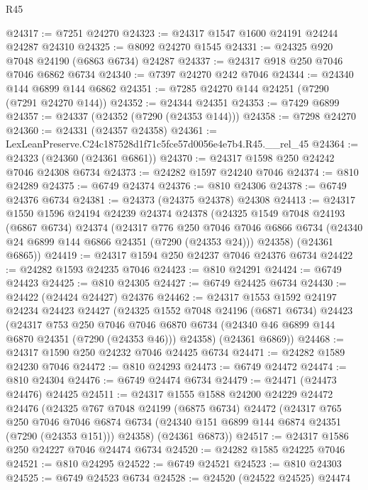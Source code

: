 \begin{lexlean}{R45}
\begin{coremodule}
{@24317 := @7251 @24270
@24323 := @24317 @1547 @1600 @24191 @24244 @24287 @24310
@24325 := @8092 @24270 @1545
@24331 := @24325 @920 @7048 @24190 (@6863 @6734) @24287
@24337 := @24317 @918 @250 @7046 @7046 @6862 @6734
@24340 := @7397 @24270 @242 @7046
@24344 := @24340 @144 @6899 @144 @6862
@24351 := @7285 @24270 @144 @24251 (@7290 (@7291 @24270 @144))
@24352 := @24344 @24351
@24353 := @7429 @6899
@24357 := @24337 (@24352 (@7290 (@24353 @144)))
@24358 := @7298 @24270
@24360 := @24331 (@24357 @24358)
@24361 := LexLeanPreserve.C24c187528d1f71c5fce57d0056e4e7b4.R45.__rel_45
@24364 := @24323 (@24360 (@24361 @6861))
@24370 := @24317 @1598 @250 @24242 @7046 @24308 @6734
@24373 := @24282 @1597 @24240 @7046
@24374 := @810 @24289
@24375 := @6749 @24374
@24376 := @810 @24306
@24378 := @6749 @24376 @6734
@24381 := @24373 (@24375 @24378) @24308
@24413 := @24317
    @1550
    @1596
    @24194
    @24239
    @24374
    @24378
    (@24325
      @1549
      @7048
      @24193
      (@6867 @6734)
      @24374
      (@24317
        @776
        @250
        @7046
        @7046
        @6866
        @6734
        (@24340 @24 @6899 @144 @6866 @24351 (@7290 (@24353 @24)))
        @24358)
      (@24361 @6865))
@24419 := @24317 @1594 @250 @24237 @7046 @24376 @6734
@24422 := @24282 @1593 @24235 @7046
@24423 := @810 @24291
@24424 := @6749 @24423
@24425 := @810 @24305
@24427 := @6749 @24425 @6734
@24430 := @24422 (@24424 @24427) @24376
@24462 := @24317
    @1553
    @1592
    @24197
    @24234
    @24423
    @24427
    (@24325
      @1552
      @7048
      @24196
      (@6871 @6734)
      @24423
      (@24317
        @753
        @250
        @7046
        @7046
        @6870
        @6734
        (@24340 @46 @6899 @144 @6870 @24351 (@7290 (@24353 @46)))
        @24358)
      (@24361 @6869))
@24468 := @24317 @1590 @250 @24232 @7046 @24425 @6734
@24471 := @24282 @1589 @24230 @7046
@24472 := @810 @24293
@24473 := @6749 @24472
@24474 := @810 @24304
@24476 := @6749 @24474 @6734
@24479 := @24471 (@24473 @24476) @24425
@24511 := @24317
    @1555
    @1588
    @24200
    @24229
    @24472
    @24476
    (@24325
      @767
      @7048
      @24199
      (@6875 @6734)
      @24472
      (@24317
        @765
        @250
        @7046
        @7046
        @6874
        @6734
        (@24340 @151 @6899 @144 @6874 @24351 (@7290 (@24353 @151)))
        @24358)
      (@24361 @6873))
@24517 := @24317 @1586 @250 @24227 @7046 @24474 @6734
@24520 := @24282 @1585 @24225 @7046
@24521 := @810 @24295
@24522 := @6749 @24521
@24523 := @810 @24303
@24525 := @6749 @24523 @6734
@24528 := @24520 (@24522 @24525) @24474
}
\end{coremodule}
\end{lexlean}
